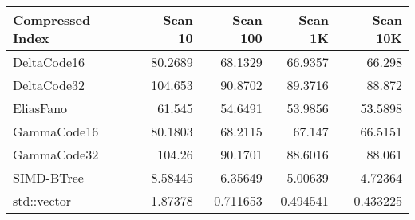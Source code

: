 \begin{tabular}{lrrrr}
\hline
 Compressed Index   &   Scan 10 &   Scan 100 &   Scan 1K &   Scan 10K \\
\hline
 DeltaCode16        &  80.2689  &  68.1329   & 66.9357   &  66.298    \\
 DeltaCode32        & 104.653   &  90.8702   & 89.3716   &  88.872    \\
 EliasFano          &  61.545   &  54.6491   & 53.9856   &  53.5898   \\
 GammaCode16        &  80.1803  &  68.2115   & 67.147    &  66.5151   \\
 GammaCode32        & 104.26    &  90.1701   & 88.6016   &  88.061    \\
 SIMD-BTree         &   8.58445 &   6.35649  &  5.00639  &   4.72364  \\
 std::vector        &   1.87378 &   0.711653 &  0.494541 &   0.433225 \\
\hline
\end{tabular}